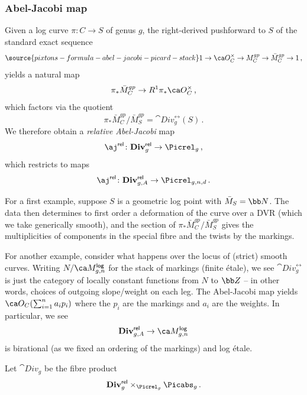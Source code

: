 \subsubsection{Abel-Jacobi map}\label{sec:abel-jacobi-map}

Given a log curve $\pi\colon C \to S$ of genus $g$,  the right-derived pushforward to $S$ of the standard exact sequence
\begin{equation}\label{eq:log_exact_seq}
\source{pixtons-formula-abel-jacobi-picard-stack}
1 \to \ca O_C^\times \to M_C^{gp} \to \bar M_C^{gp} \to 1\, ,
\end{equation}
yields a natural map
$$\pi_*\bar M_C^{gp} \to R^1\pi_*\ca O_C^\times\, ,$$
which factors via the quotient $$\pi_*\bar M_C^{gp}/\bar M_S^{gp} = \cat{Div}^{\rel}_g(S)\, .$$ We therefore obtain
a \emph{relative Abel-Jacobi} map $$\aj^{\rel}\colon \cat{Div}^{\rel}_{g} \to \Picrel_{g}\, ,$$
which restricts to maps
$$\aj^{\rel}\colon \cat{Div}^{\rel}_{g,A} \to \Picrel_{g,n,d}\, .$$

For a first example, suppose $S$ is a geometric log point with $\bar M_S = \bb N$.
The data then determines
to first order a deformation of the curve over a DVR (which we take generically smooth),  and the section of $\pi_*\bar M_C^{gp}/\bar M_S^{gp}$ gives the multiplicities of components in the special fibre and the twists by the markings.

For another example, consider what happens over the locus of (strict) smooth curves. Writing $N/\ca M^{\mathsf{log}}_{g,n}$ for the stack of markings (finite \'etale), we see $\cat{Div}^{\rel}_g$ is just the category of locally constant functions from $N$ to $\bb Z$ -- in other words, choices of outgoing slope/weight on each leg.
The Abel-Jacobi map yields  $\ca O_C(\sum_{i=1}^n a_ip_i)$ where
the $p_i$ are the markings and $a_i$ are the weights. In particular, we see  $$\cat{Div}^{\rel}_{g,A} \to \ca M^{\mathsf{log}}_{g,n}$$
is birational (as we fixed an ordering of the markings) and log \'etale.

\begin{definition}
\notready\label{def:div}
Let  $\cat{Div}_{g}$ be the fibre product
\begin{equation}
\cat{Div}^{\rel}_{g} \times_{\Picrel_{g}}\Picabs_{g}\, .
\end{equation}
\end{definition}

